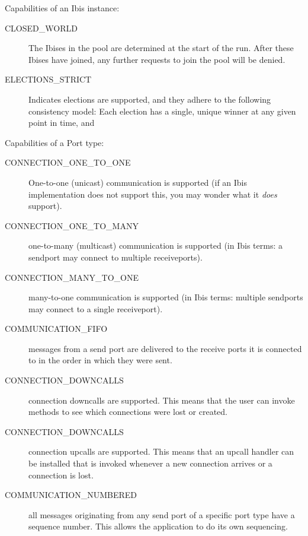 \documentclass[10pt]{article}
\begin{document}
Capabilities of an Ibis instance:

\begin{description}

\item[CLOSED_WORLD]
The Ibises in the pool are determined at the start of the
run. After these Ibises have joined, any further requests to join the
pool will be denied.

\item[ELECTIONS_STRICT]
Indicates elections are supported, and they adhere to the following 
consistency model: Each election has a single, unique winner at any
given point in time, and


\end{description}

Capabilities of a Port type:

\begin{description}
\item[CONNECTION\_ONE\_TO\_ONE]
One-to-one (unicast) communication is supported (if an Ibis
implementation
does not support this, you may wonder what it \emph{does} support).

\item[CONNECTION\_ONE\_TO\_MANY]
one-to-many (multicast) communication is supported
(in Ibis terms: a sendport
may connect to multiple receiveports).

\item[CONNECTION\_MANY\_TO\_ONE]
many-to-one communication is supported (in Ibis terms: multiple
sendports may connect to a single receiveport).

\item[COMMUNICATION\_FIFO]
messages from a send port are delivered to the receive ports it is
connected to in the order in which they were sent.

\item[CONNECTION\_DOWNCALLS]
connection downcalls are supported. This means that the user can
invoke methods to see which connections were lost or created.

\item[CONNECTION\_DOWNCALLS]
connection upcalls are supported. This means that an upcall
handler can be installed that is invoked whenever a new connection
arrives
or a connection is lost.

\item[COMMUNICATION\_NUMBERED]
all messages originating from any send port of a specific port type have
a sequence number. This allows the application to do its own sequencing.


\end{description}
\end{document}
